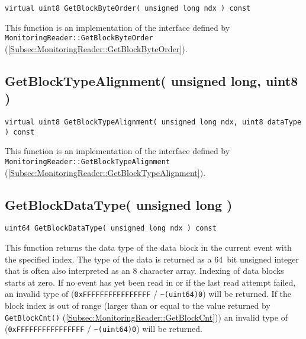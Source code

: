 \documentclass[a4paper,twoside]{article}
\begin{document}
\texttt{virtual uint8 GetBlockByteOrder( unsigned long ndx ) const}

This function is an implementation of the interface defined by \texttt{MonitoringReader::GetBlockByteOrder} (\ref{Subsec:MonitoringReader::GetBlockByteOrder}).


\subsection{GetBlockTypeAlignment( unsigned long, uint8 )}

\texttt{virtual uint8 GetBlockTypeAlignment( unsigned long ndx, uint8 dataType ) const}

This function is an implementation of the interface defined by \texttt{MonitoringReader::GetBlockTypeAlignment} (\ref{Subsec:MonitoringReader::GetBlockTypeAlignment}).


\subsection{GetBlockDataType( unsigned long )}

\texttt{uint64 GetBlockDataType( unsigned long ndx ) const}

This function returns the data type of the data block in the current event with the specified index. The type of the data is returned as a 64~bit unsigned integer
that is often also interpreted as an 8 character array. 
Indexing of data blocks starts at zero.
If no event has yet been read in or if the last read attempt failed, an invalid type of (\texttt{0xFF\-FF\-FF\-FF\-FF\-FF\-FF\-FF} / \texttt{\~{ }(uint64)0}) 
will be returned.
If the block index is out of range (larger than or equal to the value returned by \texttt{GetBlockCnt()} (\ref{Subsec:MonitoringReader::GetBlockCnt})) an 
invalid type of (\texttt{0xFF\-FF\-FF\-FF\-FF\-FF\-FF\-FF} / \texttt{\~{ }(uint64)0}) will be returned.
\end{document}
